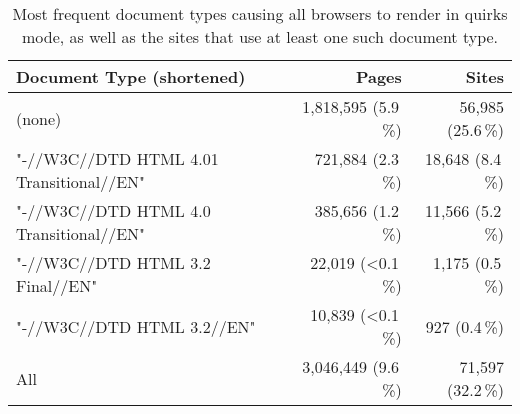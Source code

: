\begin{table}[t]
    \caption{Most frequent document types causing all browsers to render
    in quirks mode, as well as the sites that use at least one such
    document type.}
    \label{rpo:tab:top_quirksmode_doctypes}
    \centering
    \footnotesize
    \begin{tabular}{lrr}
    \toprule
    \textbf{Document Type (shortened)} & \textbf{Pages} & \textbf{Sites} \\
    \midrule
    (none) & 1,818,595 (5.9\,\%) & 56,985 (25.6\,\%) \\
    "-//W3C//DTD HTML 4.01 Transitional//EN" & 721,884 (2.3\,\%) & 18,648 (8.4\,\%) \\
    "-//W3C//DTD HTML 4.0 Transitional//EN" & 385,656 (1.2\,\%) & 11,566 (5.2\,\%) \\
    "-//W3C//DTD HTML 3.2 Final//EN" & 22,019 (<0.1\,\%) & 1,175 (0.5\,\%) \\
    "-//W3C//DTD HTML 3.2//EN" & 10,839 (<0.1\,\%) & 927 (0.4\,\%) \\
    \midrule
    All & 3,046,449 (9.6\,\%) & 71,597 (32.2\,\%) \\
    \bottomrule
    \end{tabular}
\end{table}
